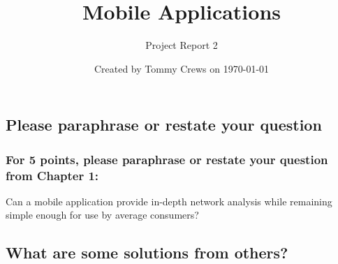 \documentclass[letterpaper]{article}            %
\title{Mobile Applications}                     %
\author{Project Report 2}                       %
\date{Created by Tommy Crews on \today}         %
\begin{document}
\newcommand{\code}[1]{\texttt{#1}}              %

\setcounter{section}{2}							%

\maketitle                                      %



%
%




\subsection{Please paraphrase or restate your question}

\subsubsection{For 5 points, please paraphrase or restate your question from Chapter 1:}

Can a mobile application provide in-depth network analysis while remaining simple enough for use by average consumers?


\subsection{What are some solutions from others?}
\end{document}
